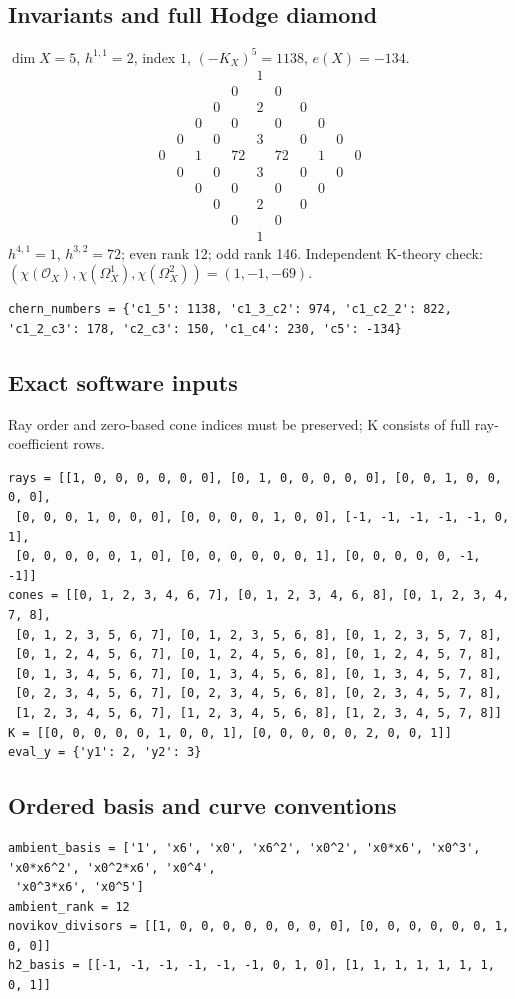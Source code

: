 \documentclass[10pt,a4paper]{article}
\begin{document}
\subsection*{Invariants and full Hodge diamond}
$\dim X=5$, $h^{1,1}=2$, index $1$, $(-K_X)^5=1138$, $e(X)=-134$.
\[\begin{array}{ccccccccccc}&&&&&1&&&&&\\&&&&0&&0&&&&\\&&&0&&2&&0&&&\\&&0&&0&&0&&0&&\\&0&&0&&3&&0&&0&\\0&&1&&72&&72&&1&&0\\&0&&0&&3&&0&&0&\\&&0&&0&&0&&0&&\\&&&0&&2&&0&&&\\&&&&0&&0&&&&\\&&&&&1&&&&&\end{array}\]
$h^{4,1}=1$, $h^{3,2}=72$; even rank 12; odd rank 146.
Independent K-theory check: $(\chi(\mathcal O_X),\chi(\Omega_X^1),\chi(\Omega_X^2))=(1, -1, -69)$.
\begin{lstlisting}
chern_numbers = {'c1_5': 1138, 'c1_3_c2': 974, 'c1_c2_2': 822, 'c1_2_c3': 178, 'c2_c3': 150, 'c1_c4': 230, 'c5': -134}
\end{lstlisting}
\subsection*{Exact software inputs}
Ray order and zero-based cone indices must be preserved; K consists of full ray-coefficient rows.
\begin{lstlisting}
rays = [[1, 0, 0, 0, 0, 0, 0], [0, 1, 0, 0, 0, 0, 0], [0, 0, 1, 0, 0, 0, 0],
 [0, 0, 0, 1, 0, 0, 0], [0, 0, 0, 0, 1, 0, 0], [-1, -1, -1, -1, -1, 0, 1],
 [0, 0, 0, 0, 0, 1, 0], [0, 0, 0, 0, 0, 0, 1], [0, 0, 0, 0, 0, -1, -1]]
cones = [[0, 1, 2, 3, 4, 6, 7], [0, 1, 2, 3, 4, 6, 8], [0, 1, 2, 3, 4, 7, 8],
 [0, 1, 2, 3, 5, 6, 7], [0, 1, 2, 3, 5, 6, 8], [0, 1, 2, 3, 5, 7, 8],
 [0, 1, 2, 4, 5, 6, 7], [0, 1, 2, 4, 5, 6, 8], [0, 1, 2, 4, 5, 7, 8],
 [0, 1, 3, 4, 5, 6, 7], [0, 1, 3, 4, 5, 6, 8], [0, 1, 3, 4, 5, 7, 8],
 [0, 2, 3, 4, 5, 6, 7], [0, 2, 3, 4, 5, 6, 8], [0, 2, 3, 4, 5, 7, 8],
 [1, 2, 3, 4, 5, 6, 7], [1, 2, 3, 4, 5, 6, 8], [1, 2, 3, 4, 5, 7, 8]]
K = [[0, 0, 0, 0, 0, 1, 0, 0, 1], [0, 0, 0, 0, 0, 2, 0, 0, 1]]
eval_y = {'y1': 2, 'y2': 3}
\end{lstlisting}
\subsection*{Ordered basis and curve conventions}
\begin{lstlisting}
ambient_basis = ['1', 'x6', 'x0', 'x6^2', 'x0^2', 'x0*x6', 'x0^3', 'x0*x6^2', 'x0^2*x6', 'x0^4',
 'x0^3*x6', 'x0^5']
ambient_rank = 12
novikov_divisors = [[1, 0, 0, 0, 0, 0, 0, 0, 0], [0, 0, 0, 0, 0, 0, 1, 0, 0]]
h2_basis = [[-1, -1, -1, -1, -1, -1, 0, 1, 0], [1, 1, 1, 1, 1, 1, 1, 0, 1]]
\end{lstlisting}
\end{document}

